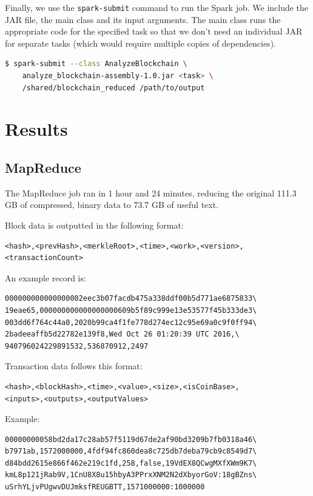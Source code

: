 \documentclass[9pt,twocolumn,twoside]{idsi}
\begin{document}
Finally, we use the \lstinline{spark-submit} command to run the Spark job. We include the JAR file, the main class and its input arguments. The main class runs the appropriate code for the specified task so that we don't need an individual JAR for separate tasks (which would require multiple copies of dependencies).

\begin{lstlisting}[language=bash]
 $ spark-submit --class AnalyzeBlockchain \
    analyze_blockchain-assembly-1.0.jar <task> \
    /shared/blockchain_reduced /path/to/output
\end{lstlisting}

\section{Results}
\subsection{MapReduce}
The MapReduce job ran in 1 hour and 24 minutes, reducing the original 111.3 GB of compressed, binary data to 73.7 GB of useful text.

Block data is outputted in the following format:
\begin{lstlisting}
<hash>,<prevHash>,<merkleRoot>,<time>,<work>,<version>,
<transactionCount>
\end{lstlisting}

An example record is:
\begin{lstlisting}
000000000000000002eec3b07facdb475a338ddf00b5d771ae6875833\
19eae65,000000000000000000609b5f89c999e13e53577f45b333de3\
003dd6f764c44a0,2020b99ca4f1fe778d274ec12c95e69a0c9f0ff94\
2badeeaffb5d22782e139f8,Wed Oct 26 01:20:39 UTC 2016,\
940796024229891532,536870912,2497
\end{lstlisting}

Transaction data follows this format:
\begin{lstlisting}
<hash>,<blockHash>,<time>,<value>,<size>,<isCoinBase>,
<inputs>,<outputs>,<outputValues>
\end{lstlisting}

Example:
\begin{lstlisting}
00000000058bd2da17c28ab57f5119d67de2af90bd3209b7fb0318a46\
b7971ab,1572000000,4fdf94fc860dea8c725db7deba79cb9c8549d7\
d84bdd2615e866f462e219c1fd,258,false,19VdEX8QCwgMXfXWm9K7\
kmL8p121jRab9V,1CnU8X8u15hbyA3PPrxXNM2N2dXbyorGoV:18gBZns\
uSrhYLjvPUgwvDUJmksfREUGBTT,1571000000:1000000
\end{lstlisting}
\end{document}
